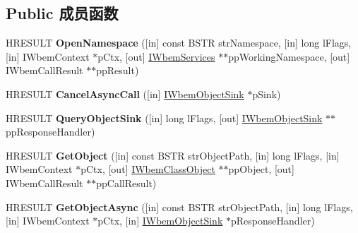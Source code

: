 \subsection*{Public 成员函数}
\begin{DoxyCompactItemize}
\item 
\mbox{\label{interface_i_wbem_services_a3d89d2885a5a1a84e850553be1705633}} 
H\+R\+E\+S\+U\+LT {\bfseries Open\+Namespace} (\mbox{[}in\mbox{]} const B\+S\+TR str\+Namespace, \mbox{[}in\mbox{]} long l\+Flags, \mbox{[}in\mbox{]} I\+Wbem\+Context $\ast$p\+Ctx, \mbox{[}out\mbox{]} \hyperlink{interface_i_wbem_services}{I\+Wbem\+Services} $\ast$$\ast$pp\+Working\+Namespace, \mbox{[}out\mbox{]} I\+Wbem\+Call\+Result $\ast$$\ast$pp\+Result)
\item 
\mbox{\label{interface_i_wbem_services_a854c4353b4345e8f0b3fa1efe9a17797}} 
H\+R\+E\+S\+U\+LT {\bfseries Cancel\+Async\+Call} (\mbox{[}in\mbox{]} \hyperlink{interface_i_wbem_object_sink}{I\+Wbem\+Object\+Sink} $\ast$p\+Sink)
\item 
\mbox{\label{interface_i_wbem_services_a66cc8db2f591eacafb48351ef7c92f8e}} 
H\+R\+E\+S\+U\+LT {\bfseries Query\+Object\+Sink} (\mbox{[}in\mbox{]} long l\+Flags, \mbox{[}out\mbox{]} \hyperlink{interface_i_wbem_object_sink}{I\+Wbem\+Object\+Sink} $\ast$$\ast$pp\+Response\+Handler)
\item 
\mbox{\label{interface_i_wbem_services_a01e4416554a6b0efc653519e4a11fc89}} 
H\+R\+E\+S\+U\+LT {\bfseries Get\+Object} (\mbox{[}in\mbox{]} const B\+S\+TR str\+Object\+Path, \mbox{[}in\mbox{]} long l\+Flags, \mbox{[}in\mbox{]} I\+Wbem\+Context $\ast$p\+Ctx, \mbox{[}out\mbox{]} \hyperlink{interface_i_wbem_class_object}{I\+Wbem\+Class\+Object} $\ast$$\ast$pp\+Object, \mbox{[}out\mbox{]} I\+Wbem\+Call\+Result $\ast$$\ast$pp\+Call\+Result)
\item 
\mbox{\label{interface_i_wbem_services_ac6b403c111ded2c34de6108941789c3d}} 
H\+R\+E\+S\+U\+LT {\bfseries Get\+Object\+Async} (\mbox{[}in\mbox{]} const B\+S\+TR str\+Object\+Path, \mbox{[}in\mbox{]} long l\+Flags, \mbox{[}in\mbox{]} I\+Wbem\+Context $\ast$p\+Ctx, \mbox{[}in\mbox{]} \hyperlink{interface_i_wbem_object_sink}{I\+Wbem\+Object\+Sink} $\ast$p\+Response\+Handler)
$$
\end{DoxyCompactItemize}
